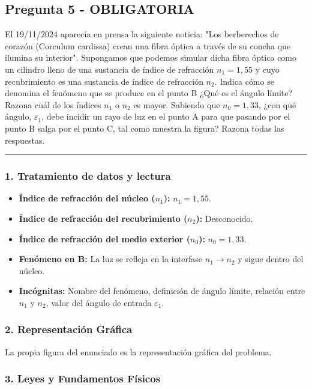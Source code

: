 \subsection{Pregunta 5 - OBLIGATORIA}
\label{subsec:5_2025_jun_res}

\begin{cajaenunciado}
El 19/11/2024 aparecía en prensa la siguiente noticia: "Los berberechos de corazón (Corculum cardissa) crean una fibra óptica a través de su concha que ilumina su interior". Supongamos que podemos simular dicha fibra óptica como un cilindro lleno de una sustancia de índice de refracción $n_1=1,55$ y cuyo recubrimiento es una sustancia de índice de refracción $n_2$. Indica cómo se denomina el fenómeno que se produce en el punto B ¿Qué es el ángulo límite? Razona cuál de los índices $n_1$ o $n_2$ es mayor. Sabiendo que $n_0=1,33$, ¿con qué ángulo, $\varepsilon_1$, debe incidir un rayo de luz en el punto A para que pasando por el punto B salga por el punto C, tal como muestra la figura? Razona todas las respuestas.
\end{cajaenunciado}
\hrule

\subsubsection*{1. Tratamiento de datos y lectura}
\begin{itemize}
    \item \textbf{Índice de refracción del núcleo ($n_1$):} $n_1 = 1,55$.
    \item \textbf{Índice de refracción del recubrimiento ($n_2$):} Desconocido.
    \item \textbf{Índice de refracción del medio exterior ($n_0$):} $n_0 = 1,33$.
    \item \textbf{Fenómeno en B:} La luz se refleja en la interfase $n_1 \rightarrow n_2$ y sigue dentro del núcleo.
    \item \textbf{Incógnitas:} Nombre del fenómeno, definición de ángulo límite, relación entre $n_1$ y $n_2$, valor del ángulo de entrada $\varepsilon_1$.
\end{itemize}

\subsubsection*{2. Representación Gráfica}
La propia figura del enunciado es la representación gráfica del problema.

\subsubsection*{3. Leyes y Fundamentos Físicos}
